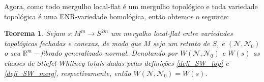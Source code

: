 \documentclass[12pt,oneside]{book} %
\newtheorem{teo}    {\hspace{0.5cm}Teorema}[chapter]
\newcommand{\R}{\mathbb{R}}
\begin{document}
\par Agora, como todo mergulho local-flat é um mergulho topológico e toda variedade topológica é uma ENR-variedade homológica, então obtemos o seguinte:

\begin{teo}\label{SW_normal_gen}
Sejam $s:M^{m}\to S^{2m}$ um mergulho local-flat entre variedades topológicas fechadas e conexas, de modo que $M$ seja um retrato de $S$, e $(\mathcal{N},\mathcal{N}_{0})$ o seu $\R^{m}-$fibrado generalizado normal. Denotando por $W(\mathcal{N},\mathcal{N}_{0})$ e $W(s)$ as classes de Stiefel-Whitney totais dadas pelas definições \ref{defi_SW_top} e \ref{defi_SW_merg}, respectivamente, então $W(\mathcal{N},\mathcal{N}_{0})=W(s)$.
\end{teo}
\end{document}
